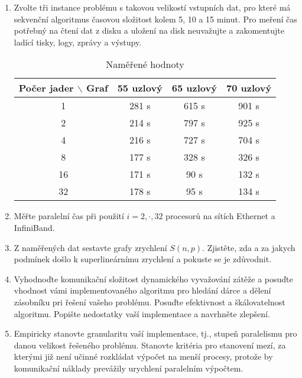 \documentclass[11pt]{article}
\begin{document}
\begin{enumerate}
\item Zvolte tři instance problému s takovou velikostí vstupních dat, pro které má
sekvenční algoritmus časovou složitost kolem 5, 10 a 15 minut. Pro
meření čas potřebný na čtení dat z disku a uložení na disk
neuvažujte a zakomentujte ladící tisky, logy, zprávy a výstupy.
\begin{table}[h]
	\caption{Naměřené hodnoty}
	\label{tab:namereneHodnoty}
	\centering
	\begin{tabular}{| c || c | c | c |}
		\hline
		\textbf{Počer jader $\backslash$ Graf} & \textbf{55 uzlový} & \textbf{65 uzlový} & \textbf{70 uzlový} \\
		\hline \hline
		1 & 281 s & 615 s & 901 s  \\
		\hline
		2 & 214 s & 797 s & 925 s \\
		\hline
		4 & 216 s & 727 s & 704 s  \\
		\hline
		8 & 177 s & 328 s & 326 s \\
		\hline
		16 & 171 s & 90 s & 132 s  \\
		\hline
		32 & 178 s & 95 s & 134 s  \\
		\hline
	\end{tabular}
\end{table}
\item Měřte paralelní čas při použití $i=2,\cdot,32$ procesorů na sítích Ethernet a InfiniBand.
\item Z naměřených dat sestavte grafy zrychlení $S(n,p)$. Zjistěte, zda a za jakych podmínek
došlo k superlineárnímu zrychlení a pokuste se je zdůvodnit.
\item Vyhodnoďte komunikační složitost dynamického vyvažování zátěže a posuďte
vhodnost vámi implementovaného algoritmu pro hledání dárce a dělení
zásobníku pri řešení vašeho problému. Posuďte efektivnost a
škálovatelnost algoritmu. Popište nedostatky vaší implementace a
navrhněte zlepšení.
\item Empiricky stanovte
granularitu vaší implementace, tj., stupeň paralelismu pro danou
velikost řešeného problému. Stanovte kritéria pro stanovení mezí, za
kterými již není učinné rozkládat výpočet na menší procesy, protože
by komunikační náklady prevážily urychlení paralelním výpočtem.

\end{enumerate}
\end{document}
